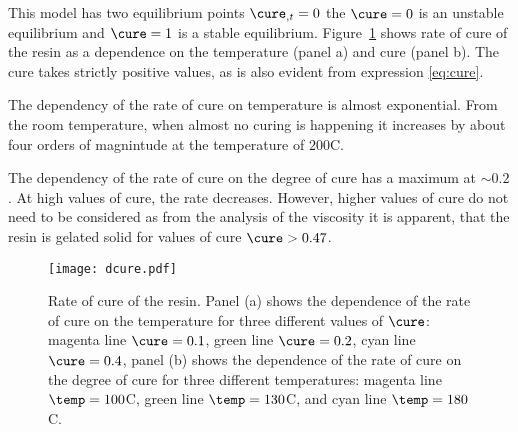 \documentclass[twoside,a4paper,12pt]{article}
\newcommand{\figref}[1]{Figure~\ref{#1}}
\begin{document}
This model has two equilibrium points $\cure_{,t}=0$ the $\cure = 0$ is an unstable equilibrium and $\cure=1$ is a stable equilibrium. \figref{fig:cure} shows rate of cure of the resin as a dependence on the temperature (panel a) and cure (panel b). The cure takes strictly positive values, as is also evident from expression \eqref{eq:cure}. 

The dependency of the rate of cure on temperature is almost exponential. From the room temperature, when almost no curing is happening it increases by about four orders of magnintude at the temperature of $200$\degree C.

The dependency of the rate of cure on the degree of cure has a maximum at $\sim 0.2$. At high values of cure, the rate decreases. However, higher values of cure do not need to be considered as from the analysis of the viscosity it is apparent, that the resin is gelated solid for values of cure $\cure > 0.47$.

\begin{figure}
  \centering
  \texttt{[image: dcure.pdf]}
  \caption{Rate of cure of the resin. Panel (a) shows the dependence of the
    rate of cure on the temperature for three different values of
    $\cure$: magenta line $\cure=0.1$, green line $\cure=0.2$, cyan
    line $\cure=0.4$, panel (b) shows the dependence of the rate of cure 
    on the degree of cure for three different temperatures: magenta
    line $\temp = 100$\degree C, green line $\temp = 130$\degree C, and cyan line
    $\temp = 180$\degree C.}
  \label{fig:cure}
\end{figure}
\end{document}
